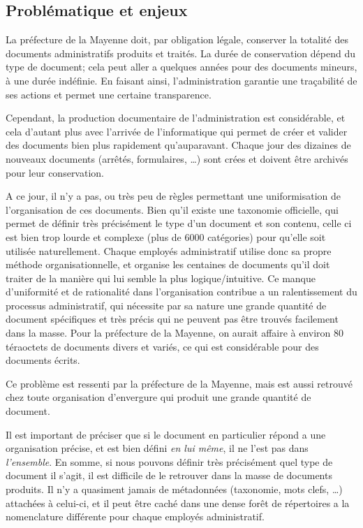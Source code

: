 \subsection{Problématique et enjeux}
La préfecture de la Mayenne doit, par obligation légale, conserver la totalité des documents administratifs produits et traités.
La durée de conservation dépend du type de document; cela peut aller a quelques années pour des documents mineurs, à une durée indéfinie.
En faisant ainsi, l'administration garantie une traçabilité de ses actions et permet une certaine transparence. 


Cependant, la production documentaire de l'administration est considérable, et cela d'autant plus avec l'arrivée de l'informatique qui permet de créer et valider des documents bien plus rapidement qu'auparavant.
Chaque jour des dizaines de nouveaux documents (arrêtés, formulaires, \ldots) sont crées et doivent être archivés pour leur conservation.


A ce jour, il n'y a pas, ou très peu de règles permettant une uniformisation de l'organisation de ces documents.
Bien qu'il existe une taxonomie officielle, qui permet de définir très précisément le type d'un document et son contenu, celle ci est bien trop lourde et complexe (plus de 6000 catégories) pour qu'elle soit utilisée naturellement.
Chaque employés administratif utilise donc sa propre méthode organisationnelle, et organise les centaines de documents qu'il doit traiter de la manière qui lui semble la plus logique/intuitive.
Ce manque d'uniformité et de rationalité dans l'organisation contribue a un ralentissement du processus administratif, qui nécessite par sa nature une grande quantité de document spécifiques et très précis qui ne peuvent pas être trouvés facilement dans la masse.
Pour la préfecture de la Mayenne, on aurait affaire à environ 80 téraoctets de documents divers et variés, ce qui est considérable pour des documents écrits. 



Ce problème est ressenti par la préfecture de la Mayenne, mais est aussi retrouvé chez toute organisation d'envergure qui produit une grande quantité de document. 


Il est important de préciser que si le document en particulier répond a une organisation précise, et est bien défini \textit{en lui même}, il ne l'est pas dans \textit{l'ensemble}.
En somme, si nous pouvons définir très précisément quel type de document il s'agit, il est difficile de le retrouver dans la masse de documents produits.
Il n'y a quasiment jamais de métadonnées (taxonomie, mots clefs, \ldots) attachées à celui-ci, et il peut être caché dans une dense forêt de répertoires a la nomenclature différente pour chaque employés administratif.


